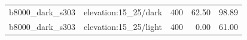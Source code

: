 \begin{longtable}{l>{\raggedright\arraybackslash}p{.42\linewidth}rrr}
b8000\_\allowbreak{}dark\_\allowbreak{}s303 & %
elevation:15\_\allowbreak{}25/dark & %
400 & %
62.50 & %
98.89 \\ %

b8000\_\allowbreak{}dark\_\allowbreak{}s303 & %
elevation:15\_\allowbreak{}25/light & %
400 & %
0.00 & %
61.00 \\ %


\end{longtable}
